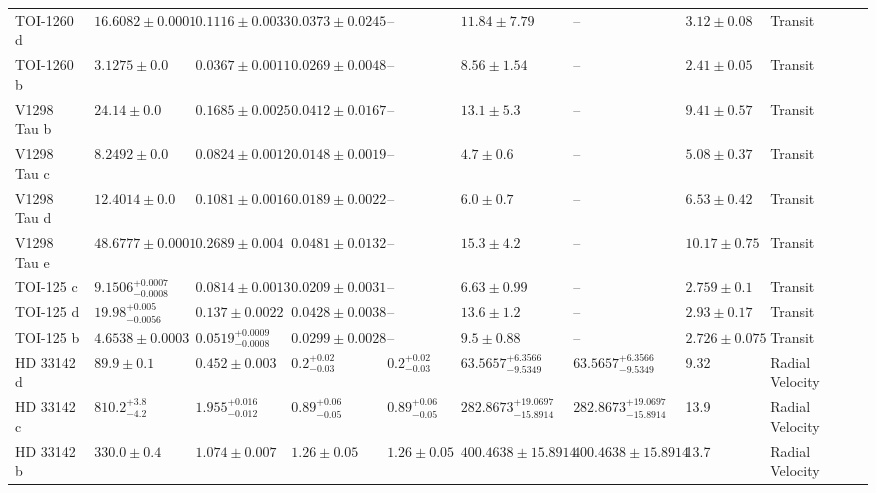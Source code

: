 \begin{tabular}{llllllllll}
TOI-1260 d & $16.6082 \pm 0.0001$ & $0.1116 \pm 0.0033$ & $0.0373 \pm 0.0245$ & -- & $11.84 \pm 7.79$ & -- & $3.12 \pm 0.08$ & Transit & \cite{LAM_ET_AL_2023} \\
TOI-1260 b & $3.1275 \pm 0.0$ & $0.0367 \pm 0.0011$ & $0.0269 \pm 0.0048$ & -- & $8.56 \pm 1.54$ & -- & $2.41 \pm 0.05$ & Transit & \cite{LAM_ET_AL_2023} \\
V1298 Tau b & $24.14 \pm 0.0$ & $0.1685 \pm 0.0025$ & $0.0412 \pm 0.0167$ & -- & $13.1 \pm 5.3$ & -- & $9.41 \pm 0.57$ & Transit & \cite{LIVINGSTON_ET_AL_2026} \\
V1298 Tau c & $8.2492 \pm 0.0$ & $0.0824 \pm 0.0012$ & $0.0148 \pm 0.0019$ & -- & $4.7 \pm 0.6$ & -- & $5.08 \pm 0.37$ & Transit & \cite{LIVINGSTON_ET_AL_2026} \\
V1298 Tau d & $12.4014 \pm 0.0$ & $0.1081 \pm 0.0016$ & $0.0189 \pm 0.0022$ & -- & $6.0 \pm 0.7$ & -- & $6.53 \pm 0.42$ & Transit & \cite{LIVINGSTON_ET_AL_2026} \\
V1298 Tau e & $48.6777 \pm 0.0001$ & $0.2689 \pm 0.004$ & $0.0481 \pm 0.0132$ & -- & $15.3 \pm 4.2$ & -- & $10.17 \pm 0.75$ & Transit & \cite{LIVINGSTON_ET_AL_2026} \\
TOI-125 c & $9.1506^{+0.0007}_{-0.0008}$ & $0.0814 \pm 0.0013$ & $0.0209 \pm 0.0031$ & -- & $6.63 \pm 0.99$ & -- & $2.759 \pm 0.1$ & Transit & \cite{NIELSEN_ET_AL__2020} \\
TOI-125 d & $19.98^{+0.005}_{-0.0056}$ & $0.137 \pm 0.0022$ & $0.0428 \pm 0.0038$ & -- & $13.6 \pm 1.2$ & -- & $2.93 \pm 0.17$ & Transit & \cite{NIELSEN_ET_AL__2020} \\
TOI-125 b & $4.6538 \pm 0.0003$ & $0.0519^{+0.0009}_{-0.0008}$ & $0.0299 \pm 0.0028$ & -- & $9.5 \pm 0.88$ & -- & $2.726 \pm 0.075$ & Transit & \cite{NIELSEN_ET_AL__2020} \\
HD 33142 d & $89.9 \pm 0.1$ & $0.452 \pm 0.003$ & $0.2^{+0.02}_{-0.03}$ & $0.2^{+0.02}_{-0.03}$ & $63.5657^{+6.3566}_{-9.5349}$ & $63.5657^{+6.3566}_{-9.5349}$ & 9.32 & Radial Velocity & \cite{TRIFONOV_ET_AL_2022} \\
HD 33142 c & $810.2^{+3.8}_{-4.2}$ & $1.955^{+0.016}_{-0.012}$ & $0.89^{+0.06}_{-0.05}$ & $0.89^{+0.06}_{-0.05}$ & $282.8673^{+19.0697}_{-15.8914}$ & $282.8673^{+19.0697}_{-15.8914}$ & 13.9 & Radial Velocity & \cite{TRIFONOV_ET_AL_2022} \\
HD 33142 b & $330.0 \pm 0.4$ & $1.074 \pm 0.007$ & $1.26 \pm 0.05$ & $1.26 \pm 0.05$ & $400.4638 \pm 15.8914$ & $400.4638 \pm 15.8914$ & 13.7 & Radial Velocity & \cite{TRIFONOV_ET_AL_2022} \\

\end{tabular}
